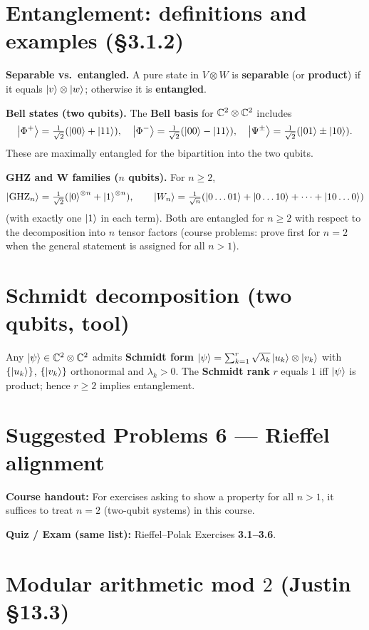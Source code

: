 \section{Entanglement: definitions and examples (\S3.1.2)}

\textbf{Separable vs.\ entangled.} A pure state in $V\otimes W$ is \textbf{separable} (or \textbf{product}) if it equals $\left|v\right\rangle\otimes\left|w\right\rangle$; otherwise it is \textbf{entangled}.

\textbf{Bell states (two qubits).} The \textbf{Bell basis} for $\mathbb{C}^2\otimes\mathbb{C}^2$ includes
\[
\left|\Phi^+\right\rangle=\tfrac{1}{\sqrt{2}}(\left|00\right\rangle+\left|11\right\rangle),\quad
\left|\Phi^-\right\rangle=\tfrac{1}{\sqrt{2}}(\left|00\right\rangle-\left|11\right\rangle),\quad
\left|\Psi^\pm\right\rangle=\tfrac{1}{\sqrt{2}}(\left|01\right\rangle\pm\left|10\right\rangle).
\]
These are maximally entangled for the bipartition into the two qubits.

\textbf{GHZ and W families ($n$ qubits).} For $n\ge 2$,
\[
\left|\mathrm{GHZ}_n\right\rangle=\tfrac{1}{\sqrt{2}}(\left|0\right\rangle^{\otimes n}+\left|1\right\rangle^{\otimes n}),\qquad
\left|W_n\right\rangle=\tfrac{1}{\sqrt{n}}(\left|0\ldots 01\right\rangle+\left|0\ldots 10\right\rangle+\cdots+\left|10\ldots 0\right\rangle)
\]
(with exactly one $\left|1\right\rangle$ in each term). Both are entangled for $n\ge 2$ with respect to the decomposition into $n$ tensor factors (course problems: prove first for $n=2$ when the general statement is assigned for all $n>1$).

\section{Schmidt decomposition (two qubits, tool)}

Any $\left|\psi\right\rangle\in\mathbb{C}^2\otimes\mathbb{C}^2$ admits \textbf{Schmidt form} $\left|\psi\right\rangle=\sum_{k=1}^r \sqrt{\lambda_k}\left|u_k\right\rangle\otimes\left|v_k\right\rangle$ with $\{\left|u_k\right\rangle\}$, $\{\left|v_k\right\rangle\}$ orthonormal and $\lambda_k>0$. The \textbf{Schmidt rank} $r$ equals $1$ iff $\left|\psi\right\rangle$ is product; hence $r\ge 2$ implies entanglement.

\section{Suggested Problems 6 --- Rieffel alignment}

\noindent\textbf{Course handout:} For exercises asking to show a property for all $n>1$, it suffices to treat \textbf{$n=2$} (two-qubit systems) in this course.

\noindent\textbf{Quiz / Exam (same list):} Rieffel--Polak Exercises \textbf{3.1--3.6}.

\section{Modular arithmetic mod $2$ (Justin \S13.3)}

